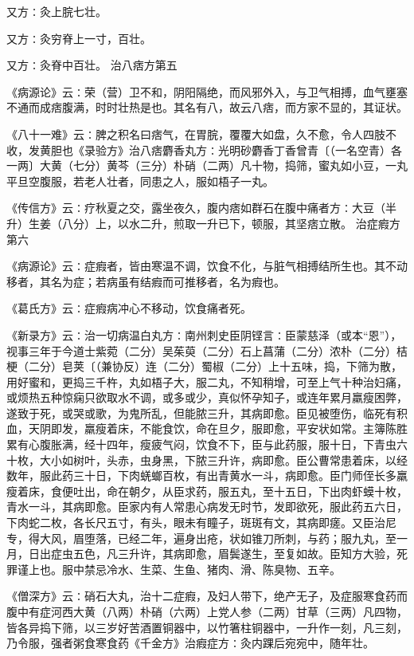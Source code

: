 \documentclass[a4paper,12pt,UTF8,twoside]{ctexbook}
\begin{document}
又方∶灸上脘七壮。

又方∶灸穷脊上一寸，百壮。

又方∶灸脊中百壮。
治八痞方第五

《病源论》云∶荣（营）卫不和，阴阳隔绝，而风邪外入，与卫气相搏，血气壅塞不通而成痞腹满，时时壮热是也。其名有八，故云八痞，而方家不显的，其证状。

《八十一难》云∶脾之积名曰痞气，在胃脘，覆覆大如盘，久不愈，令人四肢不收，发黄胆也《录验方》治八痞麝香丸方∶光明砂麝香丁香曾青〔（一名空青）各一两〕大黄（七分）黄芩（三分）朴硝（二两）凡十物，捣筛，蜜丸如小豆，一丸平旦空腹服，若老人壮者，同患之人，服如梧子一丸。

《传信方》云∶疗秋夏之交，露坐夜久，腹内痞如群石在腹中痛者方∶大豆（半升）生姜（八分）上，以水二升，煎取一升已下，顿服，其坚痞立散。
治症瘕方第六

《病源论》云∶症瘕者，皆由寒温不调，饮食不化，与脏气相搏结所生也。其不动移者，其名为症；若病虽有结瘕而可推移者，名为瘕也。

《葛氏方》云∶症瘕病冲心不移动，饮食痛者死。

《新录方》云∶治一切病温白丸方∶南州刺史臣阴铿言∶臣蒙慈泽（或本“恩”），视事三年于今道士紫菀（二分）吴茱萸（二分）石上菖蒲（二分）浓朴（二分）桔梗（二分）皂荚〔（兼协反）连（二分）蜀椒（二分）上十五味，捣，下筛为散，用好蜜和，更捣三千杵，丸如梧子大，服二丸，不知稍增，可至上气十种治妇痛，或烦热五种惊痫只欲取水不调，或多或少，真似怀孕知子，或连年累月羸瘦困弊，遂致于死，或哭或歌，为鬼所乱，但能脓三升，其病即愈。臣见被堕伤，临死有积血，天阴即发，羸瘦着床，不能食饮，命在旦夕，服即愈，平安状如常。主簿陈胜累有心腹胀满，经十四年，瘦疲气闷，饮食不下，臣与此药服，服十日，下青虫六十枚，大小如树叶，头赤，虫身黑，下脓三升许，病即愈。臣公曹常患着床，以经数年，服此药三十日，下肉蜣螂百枚，有出青黄水一斗，病即愈。臣门师侄长多羸瘦着床，食便吐出，命在朝夕，从臣求药，服五丸，至十五日，下出肉虾蟆十枚，青水一斗，其病即愈。臣家内有人常患心病发无时节，发即欲死，服此药五六日，下肉蛇二枚，各长尺五寸，有头，眼未有瞳子，斑斑有文，其病即瘥。又臣治尼专，得大风，眉堕落，已经二年，遍身出疮，状如锥刀所刺，与药；服九丸，至一月，日出症虫五色，凡三升许，其病即愈，眉鬓遂生，至复如故。臣知方大验，死罪谨上也。服中禁忌冷水、生菜、生鱼、猪肉、滑、陈臭物、五辛。

《僧深方》云∶硝石大丸，治十二症瘕，及妇人带下，绝产无子，及症服寒食药而腹中有症河西大黄（八两）朴硝（六两）上党人参（二两）甘草（三两）凡四物，皆各异捣下筛，以三岁好苦酒置铜器中，以竹箸柱铜器中，一升作一刻，凡三刻，乃令服，强者粥食寒食药《千金方》治瘕症方∶灸内踝后宛宛中，随年壮。
\end{document}
